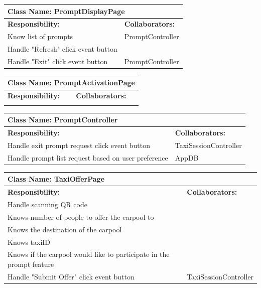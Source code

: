 \documentclass[]{article}
\begin{document}
\begin{table}[H]
\centering
\begin{tabular}{|p{6cm}|p{6cm}|}
\hline 
 \multicolumn{2}{|l|}{\textbf{Class Name: PromptDisplayPage}} \\
\hline
\textbf{Responsibility:} & \textbf{Collaborators:} \\
\hline
Know list of prompts & PromptController\\ \hline
Handle "Refresh" click event button & \\ \hline
Handle "Exit" click event button & PromptController \\ \hline
\end{tabular}
\end{table}

\begin{table}[H]
\centering
\begin{tabular}{|p{6cm}|p{6cm}|}
\hline 
 \multicolumn{2}{|l|}{\textbf{Class Name: PromptActivationPage}} \\
\hline
\textbf{Responsibility:} & \textbf{Collaborators:} \\
\hline
\vspace{1in} & \\
\hline
\end{tabular}
\end{table}

\begin{table}[H]
\centering
\begin{tabular}{|p{6cm}|p{6cm}|}
\hline 
 \multicolumn{2}{|l|}{\textbf{Class Name: PromptController}} \\
\hline
\textbf{Responsibility:} & \textbf{Collaborators:} \\
\hline
Handle exit prompt request click event button & TaxiSessionController\\ \hline
Handle prompt list request based on user preference & AppDB\\ \hline
\end{tabular}
\end{table}

\begin{table}[H]
\centering
\begin{tabular}{|p{6cm}|p{6cm}|}
\hline 
 \multicolumn{2}{|l|}{\textbf{Class Name: TaxiOfferPage}} \\
\hline
\textbf{Responsibility:} & \textbf{Collaborators:} \\
\hline
Handle scanning QR code &  \\ \hline
Knows number of people to offer the carpool to &\\ \hline
Knows the destination of the carpool &\\ \hline
Knows taxiID &\\ \hline
Knows if the carpool would like to participate in the prompt feature & \\ \hline
Handle "Submit Offer" click event button & TaxiSessionController\\ \hline
\end{tabular}
\end{table}
\end{document}
